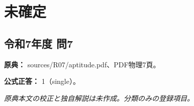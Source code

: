 \section{未確定}

\subsection{令和7年度 問7}
\label{q:r07-reg-apt-07}

\noindent\textbf{原典：} sources/R07/aptitude.pdf、PDF物理7頁。

\textbf{公式正答：} 1（single）。

\par\textit{原典本文の校正と独自解説は未作成。分類のみの登録項目。}
